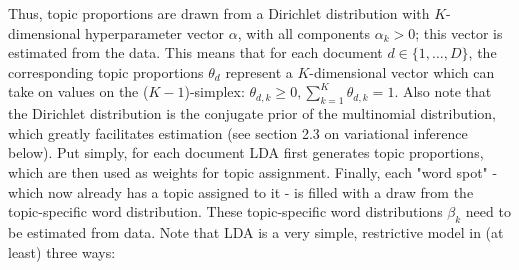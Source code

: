 \noindent
Thus, topic proportions are drawn from a Dirichlet distribution with $K$-dimensional hyperparameter vector $\alpha$, with all components $\alpha_k > 0$; this vector is estimated from the data. This means that for each document $d \in \{1,\dots,D\}$, the corresponding topic proportions $\theta_d$ represent a $K$-dimensional vector which can take on values on the ($K-1$)-simplex: $\theta_{d,k} \geq 0, \sum_{k=1}^{K}\theta_{d,k}=1$. Also note that the Dirichlet distribution is the conjugate prior of the multinomial distribution, which greatly facilitates estimation (see section 2.3 on variational inference below). Put simply, for each document LDA first generates topic proportions, which are then used as weights for topic assignment. Finally, each "word spot" - which now already has a topic assigned to it - is filled with a draw from the topic-specific word distribution. These topic-specific word distributions $\beta_k$ need to be estimated from data.
Note that LDA is a very simple, restrictive model in (at least) three ways:

